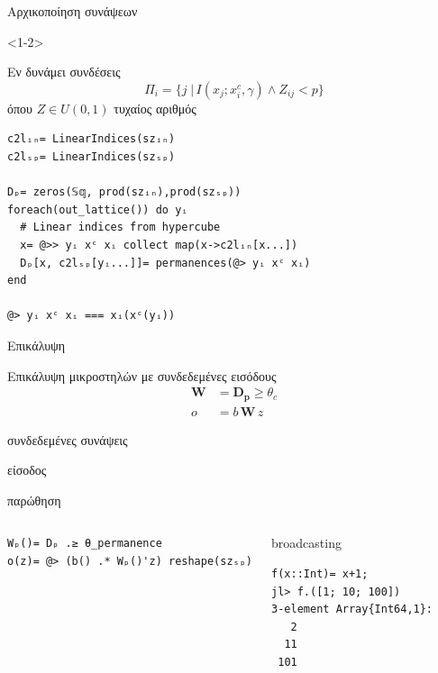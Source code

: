 \documentclass[10pt,lualatex]{beamer}
\begin{document}
\begin{frame}[fragile]{Αρχικοποίηση συνάψεων}
\begin{onlyenv}<1-2>
\begin{block}{Εν δυνάμει συνδέσεις}
  \[ Π_i= \{j \;|\, I(x_j; x_i^c, γ) \wedge Z_{ij} < p\} \]
  όπου $Ζ \in U(0,1)$ τυχαίος αριθμός
\end{block}
\pause
\begin{verbatim}
c2lᵢₙ= LinearIndices(szᵢₙ)
c2lₛₚ= LinearIndices(szₛₚ)

Dₚ= zeros(𝕊𝕢, prod(szᵢₙ),prod(szₛₚ))
foreach(out_lattice()) do yᵢ
  # Linear indices from hypercube
  x= @>> yᵢ xᶜ xᵢ collect map(x->c2lᵢₙ[x...])
  Dₚ[x, c2lₛₚ[yᵢ...]]= permanences(@> yᵢ xᶜ xᵢ)
end

@> yᵢ xᶜ xᵢ === xᵢ(xᶜ(yᵢ))
\end{verbatim}
\end{onlyenv}

\end{frame}

\begin{frame}[fragile]{Επικάλυψη}
\begin{block}{Επικάλυψη μικροστηλών με συνδεδεμένες εισόδους}
  \begin{align*}
    \mathbf{W} &= \mathbf{D_p} \ge θ_c\\
    o &= b\,\mathbf{W}\,z
  \end{align*}
  \vspace{-2.2\topsep}
  \begin{description}[ddddd]
		\small
	  \item[$\mathbf{W}$] [$ℓ_{in} × ℓ_{sp}$] συνδεδεμένες συνάψεις
	  \item[$z$] [$ℓ_{in}$] είσοδος
	  \item[$b$] [$ℓ_{sp}$] παρώθηση
  \end{description}
\end{block}
\pause
\begin{columns}[T]
\begin{verbatim}
Wₚ()= Dₚ .≥ θ_permanence
o(z)= @> (b() .* Wₚ()'z) reshape(szₛₚ)
\end{verbatim}
\pause
{}
\begin{block}{broadcasting}
\begin{verbatim}
f(x::Int)= x+1;
jl> f.([1; 10; 100])
3-element Array{Int64,1}:
   2
  11
 101
\end{verbatim}
\end{block}
\end{columns}
\end{frame}
\end{document}
